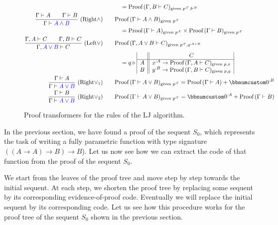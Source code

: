 \begin{figure}
\begin{centering}
{\begin{minipage}[t]{1\columnwidth - 2\fboxsep - 2\fboxrule}
\begin{align*}
 & \quad\quad=\text{Proof}\,(\Gamma,B\vdash C)_{\text{given }p^{:\Gamma},b^{:B}}\\
\frac{\Gamma\vdash A\quad\quad\Gamma\vdash B}{\Gamma\vdash{\color{blue}A\wedge B}}~(\text{Right}\wedge)\quad & \quad\text{Proof}\,(\Gamma\vdash A\wedge B)_{\text{given }p^{:\Gamma}}\\
 & \quad\quad=\text{Proof}\,(\Gamma\vdash A)_{\text{given }p^{:\Gamma}}\times\text{Proof}\,(\Gamma\vdash B)_{\text{given }p^{:\Gamma}}\\
\frac{\Gamma,A\vdash C\quad\quad\Gamma,B\vdash C}{\Gamma,{\color{blue}A\vee B}\vdash C}~(\text{Left}\vee)\quad & \quad\text{Proof}\,(\Gamma,A\vee B\vdash C)_{\text{given }p^{:\Gamma},q^{:A+B}}\\
 & \quad\quad=q\triangleright\begin{array}{|c||c|}
 & C\\
\hline A & x^{:A}\rightarrow\text{Proof}\,(\Gamma,A\vdash C)_{\text{given }p,x}\\
B & y^{:B}\rightarrow\text{Proof}\,(\Gamma,B\vdash C)_{\text{given }p,y}
\end{array}\\
\frac{\Gamma\vdash A}{\Gamma\vdash{\color{blue}A\vee B}}~(\text{Right}\vee_{1})\quad & \quad\text{Proof}\,(\Gamma\vdash A\vee B)_{\text{given }p^{:\Gamma}}=\text{Proof}\,(\Gamma\vdash A)+\bbnum 0^{:B}\\
\frac{\Gamma\vdash B}{\Gamma\vdash{\color{blue}A\vee B}}~(\text{Right}\vee_{2})\quad & \quad\text{Proof}\,(\Gamma\vdash A\vee B)_{\text{given }p^{:\Gamma}}=\bbnum 0^{:A}+\text{Proof}\,(\Gamma\vdash B)
\end{align*}
%
\end{minipage}}
\par\end{centering}
\caption{\label{fig:proof-transformers-for-LJ-rules}Proof transformers for
the rules of the LJ algorithm.}
\end{figure}

In the previous section, we have found a proof of the sequent $S_{0}$,
which represents the task of writing a fully parametric function with
type signature $(\left(A\rightarrow A\right)\rightarrow B)\rightarrow B$).
Let us now see how we can extract the code of that function from the
proof of the sequent $S_{0}$.

We start from the leaves of the proof tree and move step by step towards
the initial sequent. At each step, we shorten the proof tree by replacing
some sequent by its corresponding evidence-of-proof code. Eventually
we will replace the initial sequent by its corresponding code. Let
us see how this procedure works for the proof tree of the sequent
$S_{0}$ shown in the previous section.

